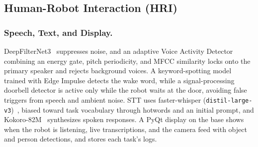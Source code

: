 \subsection{Human-Robot Interaction (HRI)}


\subsubsection{Speech, Text, and Display.} DeepFilterNet3~\cite{schroeter2023deepfilternet} suppresses noise, and an adaptive Voice Activity Detector combining an energy gate, pitch periodicity, and MFCC similarity locks onto the primary speaker and rejects background voices. A keyword-spotting model trained with Edge Impulse detects the wake word, while a signal-processing doorbell detector is active only while the robot waits at the door, avoiding false triggers from speech and ambient noise. STT uses faster-whisper (\texttt{distil-large-v3})~\cite{radford2023whisper}, biased toward task vocabulary through hotwords and an initial prompt, and Kokoro-82M~\cite{hexgrad_2025} synthesizes spoken responses. A PyQt display on the base shows when the robot is listening, live transcriptions, and the camera feed with object and person detections, and stores each task's logs.



